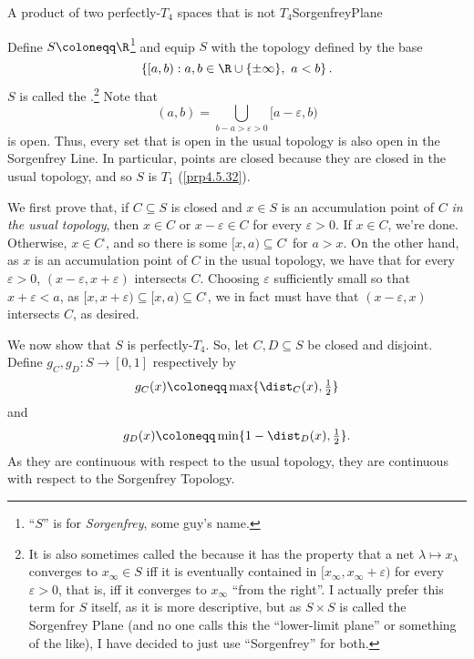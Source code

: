 \begin{exm}{A product of two perfectly-$T_4$ spaces that is not $T_4$}{SorgenfreyPlane}
\forwardref

\noindent
Define $S\coloneqq \R$\footnote{``$S$'' is for \emph{Sorgenfrey}, some guy's name.} and equip $S$ with the topology defined by the base
\begin{equation}
\left\{ [a,b):a,b\in \R \cup \{ \pm \infty\} ,\ a<b\right\} .
\end{equation}
$S$ is called the .\footnote{It is also sometimes called the  because it has the property that a net $\lambda \mapsto x_{\lambda}$ converges to $x_{\infty}\in S$ iff it is eventually contained in $[x_{\infty},x_{\infty}+\varepsilon )$ for every $\varepsilon >0$, that is, iff it converges to $x_{\infty}$ ``from the right''.  I actually prefer this term for $S$ itself, as it is more descriptive, but as $S\times S$ is called the Sorgenfrey Plane (and no one calls this the ``lower-limit plane'' or something of the like), I have decided to just use ``Sorgenfrey'' for both.}  Note that
\begin{equation}
(a,b)=\bigcup _{b-a>\varepsilon >0}[a-\varepsilon ,b)
\end{equation}
is open.  Thus, every set that is open in the usual topology is also open in the Sorgenfrey Line.  In particular, points are closed because they are closed in the usual topology, and so $S$ is $T_1$ (\cref{prp4.5.32}).

We first prove that, if $C\subseteq S$ is closed and $x\in S$ is an accumulation point of $C$ \emph{in the usual topology}, then $x\in C$ or $x-\varepsilon \in C$ for every $\varepsilon >0$.  If $x\in C$, we're done.  Otherwise, $x\in C^{\comp}$, and so there is some $[x,a)\subseteq C^{\comp}$ for $a>x$.  On the other hand, as $x$ is an accumulation point of $C$ in the usual topology, we have that for every $\varepsilon >0$, $(x-\varepsilon ,x+\varepsilon )$ intersects $C$.  Choosing $\varepsilon$ sufficiently small so that $x+\varepsilon <a$, as $[x,x+\varepsilon )\subseteq [x,a)\subseteq C^{\comp}$, we in fact must have that $(x-\varepsilon ,x)$ intersects $C$, as desired.

We now show that $S$ is perfectly-$T_4$.  So, let $C,D\subseteq S$ be closed and disjoint.  Define $g_C,g_D\colon S\rightarrow [0,1]$ respectively by
\begin{equation}
g_C(x)\coloneqq \max \{ \dist _C(x),\tfrac{1}{2}\}
\end{equation}
and
\begin{equation}
g_D(x)\coloneqq \min \{ 1-\dist _D(x),\tfrac{1}{2}\} .
\end{equation}
As they are continuous with respect to the usual topology, they are continuous with respect to the Sorgenfrey Topology.


\end{exm}
